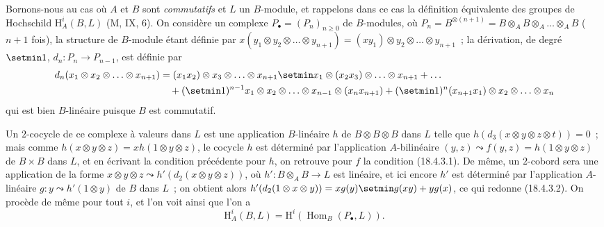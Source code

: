 \begin{env}[18.4.4]
\label{0.18.4.4-fr}
Bornons-nous au cas où $A$ et $B$ sont \emph{commutatifs} et $L$ un
$B$-module, et rappelons dans ce cas la définition équivalente des groupes de
Hochschild $\mathrm H_A^i(B,L)$ (M, IX, 6). On considère un complexe
$P_\bullet=(P_n)_{n\geqslant0}$ de $B$-modules, où
$P_n=B^{\otimes(n+1)}=B\otimes_A B\otimes_A\ldots\otimes_A B$
($n+1$ fois), la structure de $B$-module étant définie
par
$x(y_1\otimes y_2\otimes\ldots\otimes y_{n+1})=(xy_1)\otimes y_2\otimes\ldots\otimes y_{n+1}$~;
la dérivation, de degré $\setmin 1$, $d_n:P_n\to P_{n-1}$, est
définie par
\begin{align*}
  d_n(x_1\otimes x_2\otimes\ldots\otimes x_{n+1})
    &=(x_1x_2)\otimes x_3\otimes\ldots\otimes x_{n+1}
      \setmin x_1\otimes(x_2x_3)\otimes\ldots\otimes x_{n+1}+\ldots\\
    &\quad+(\setmin 1)^{n-1}x_1\otimes x_2\otimes\ldots\otimes x_{n-1}
      \otimes(x_nx_{n+1})
      +(\setmin 1)^n(x_{n+1}x_1)\otimes x_2\otimes\ldots\otimes x_n
\end{align*}
qui est bien $B$-linéaire puisque $B$ est commutatif.

Un $2$-cocycle de ce complexe à valeurs dans $L$ est une application
$B$-linéaire $h$ de $B\otimes B\otimes B$ dans $L$ telle que
$h(d_3(x\otimes y\otimes z\otimes t))=0$~; mais comme
$h(x\otimes y\otimes z)=xh(1\otimes y\otimes z)$, le cocycle $h$ est déterminé
par l'application $A$-bilinéaire
$(y,z)\leadsto f(y,z)=h(1\otimes y\otimes z)$ de $B\times B$ dans $L$, et
en écrivant la condition précédente pour $h$, on retrouve pour $f$ la
condition (18.4.3.1). De même, un $2$-cobord sera une application de la forme
$x\otimes y\otimes z\leadsto h'(d_2(x\otimes y\otimes z))$, où
$h':B\otimes_A B\to L$ est linéaire, et ici encore $h'$ est déterminé par
l'application $A$-linéaire $g:y\leadsto h'(1\otimes y)$ de $B$ dans $L$~;
on obtient alors
$h'(d_2(1\otimes x\otimes y))=xg(y)\setmin g(xy)+yg(x)$, ce qui redonne (18.4.3.2).
On procède de même pour tout $i$, et l'on voit ainsi que l'on a
\begin{equation}
\label{0.18.4.4.1-fr}
\tag{18.4.4.1}
  \mathrm H_A^i(B,L)=\mathrm H^i(\operatorname{Hom}_B(P_\bullet,L)).
\end{equation}
\end{env}

